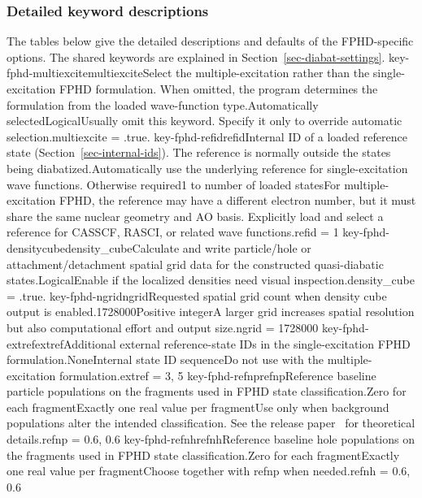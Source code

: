\subsubsection*{Detailed keyword descriptions}
The tables below give the detailed descriptions and defaults of the FPHD-specific options. The shared keywords are explained in Section~\ref{sec-diabat-settings}.
\keyword
{key-fphd-multiexcite}{multiexcite}{Select the multiple-excitation rather than the single-excitation FPHD formulation. When omitted, the program determines the formulation from the loaded wave-function type.}{\OpOptional}{\OpLogic}{Automatically selected}{Logical}{Usually omit this keyword. Specify it only to override automatic selection.}{multiexcite = .true.}
\keyword
{key-fphd-refid}{refid}{Internal ID of a loaded reference state (Section~\ref{sec-internal-ids}). The reference is normally outside the states being diabatized.}{\OpOptional}{\OpInt}{Automatically use the underlying reference for single-excitation wave functions. Otherwise required}{1 to number of loaded states}{For multiple-excitation FPHD, the reference may have a different electron number, but it must share the same nuclear geometry and AO basis. Explicitly load and select a reference for CASSCF, RASCI, or related wave functions.}{refid = 1}
\keyword
{key-fphd-densitycube}{density\_cube}{Calculate and write particle/hole or attachment/detachment spatial grid data for the constructed quasi-diabatic states.}{\OpOptional}{\OpLogic}{\OpFalse}{Logical}{Enable if the localized densities need visual inspection.}{density\_cube = .true.}
\keyword
{key-fphd-ngrid}{ngrid}{Requested spatial grid count when density cube output is enabled.}{\OpOptional}{\OpInt}{1728000}{Positive integer}{A larger grid increases spatial resolution but also computational effort and output size.}{ngrid = 1728000}
\keyword
{key-fphd-extref}{extref}{Additional external reference-state IDs in the single-excitation FPHD formulation.}{\OpOptional}{\OpIntseq}{None}{Internal state ID sequence}{Do not use with the multiple-excitation formulation.}{extref = 3, 5}
\keyword
{key-fphd-refnp}{refnp}{Reference baseline particle populations on the fragments used in FPHD state classification.}{\OpOptional}{\OpRealseq}{Zero for each fragment}{Exactly one real value per fragment}{Use only when background populations alter the intended classification. See the release paper~\cite{Diabat2026} for theoretical details.}{refnp = 0.6, 0.6}
\keyword
{key-fphd-refnh}{refnh}{Reference baseline hole populations on the fragments used in FPHD state classification.}{\OpOptional}{\OpRealseq}{Zero for each fragment}{Exactly one real value per fragment}{Choose together with refnp when needed.}{refnh = 0.6, 0.6}

